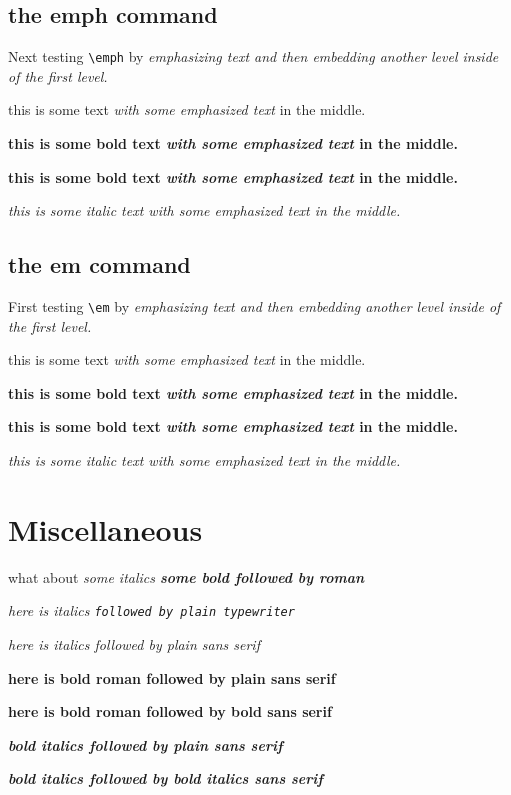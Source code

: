 \documentclass{article}
\begin{document}
\subsection{the emph command}

Next testing \verb#\emph# by \emph{emphasizing text and then \emph{embedding another
level inside} of the first level.}

this is some text \emph{with some emphasized text} in the middle.

{\bf this is some bold text \emph{with some emphasized text} in the middle.}

\textbf{this is some bold text \emph{with some emphasized text} in the middle.}

\textit{this is some italic text \emph{with some emphasized text} in the middle.}

\subsection{the em command}

First testing \verb#\em# by {\em emphasizing text and then {\em embedding another
level inside} of the first level.}

this is some text {\em with some emphasized text} in the middle.

{\bf this is some bold text {\em with some emphasized text} in the middle.}

\textbf{this is some bold text {\em with some emphasized text} in the middle.}

\textit{this is some italic text {\em with some emphasized text} in the middle.}

\section{Miscellaneous}
what about \it some italics \bf some bold \rm followed by roman

{\it here is italics \tt followed by plain typewriter}

{\it here is italics \sf followed by plain sans serif}

\textbf{here is bold roman \sf followed by plain sans serif}

{\bf here is bold roman \textsf{followed by bold sans serif}}

\textbf{\textit{bold italics \sf followed by plain sans serif}}

\textbf{\textit{bold italics \textsf{followed by bold italics sans serif}}}
\end{document}
